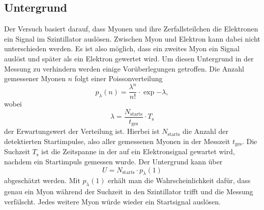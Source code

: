 \subsection{Untergrund}
\label{ssec:untergrund}

Der Versuch basiert darauf, dass Myonen und ihre Zerfallsteilchen die Elektronen ein Signal im Szintillator auslösen.
Zwischen Myon und Elektron kann dabei nicht unterschieden werden.
Es ist also möglich, dass ein zweites Myon ein Signal auslöst und später als ein Elektron gewertet wird.
Um diesen Untergrund in der Messung zu verhindern werden einige Vorüberlegungen getroffen.
Die Anzahl gemessener Myonen $n$ folgt einer Poissonverteilung
\begin{equation}
    p_\lambda (n) = \frac{\lambda ^n}{n !} \cdot \exp{- \lambda},
\end{equation}
wobei
\begin{equation}
    \lambda = \frac{N_\text{starts}}{t_\text{ges}} \cdot T_\text{s}
\end{equation}
der Erwartungswert der Verteilung ist.
Hierbei ist $N_\text{starts}$ die Anzahl der detektierten Startimpulse, also aller gemessenen Myonen in der Messzeit $t_\text{ges}$.
Die Suchzeit $T_\text{s}$ ist die Zeitspanne in der auf ein Elektronsignal gewartet wird, nachdem ein Startimpuls gemessen wurde.
Der Untergrund kann über 
\begin{equation}
    U = N_\text{starts} \cdot p_\lambda (1)
    \label{eqn:poisson_untergrund}
\end{equation}
abgeschätzt werden.
Mit $p_\lambda (1)$ erhält man die Wahrscheinlichkeit dafür, dass genau ein Myon während der Suchzeit in den Szintillator trifft und die Messung verfälscht.
Jedes weitere Myon würde wieder ein Startsignal auslösen.